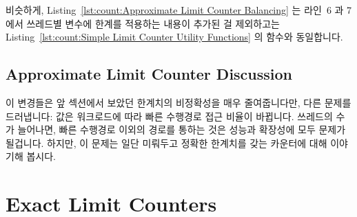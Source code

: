 비슷하게,
Listing~\ref{lst:count:Approximate Limit Counter Balancing} 는 라인~6 과 7 에서
쓰레드별  변수에  한계를 적용하는 내용이
추가된 걸 제외하고는
Listing~\ref{lst:count:Simple Limit Counter Utility Functions} 의
 함수와 동일합니다.

\subsection{Approximate Limit Counter Discussion}

이 변경들은 앞 섹션에서 보았던 한계치의 비정확성을 매우 줄여줍니다만, 다른
문제를 드러냅니다:  값은 워크로드에 따라 빠른 수행경로 접근
비율이 바뀝니다.
쓰레드의 수가 늘어나면, 빠른 수행경로 이외의 경로를 통하는 것은 성능과 확장성에
모두 문제가 될겁니다.
하지만, 이 문제는 일단 미뤄두고 정확한 한계치를 갖는 카운터에 대해 이야기해
봅시다.

\section{Exact Limit Counters}
\label{sec:count:Exact Limit Counters}

